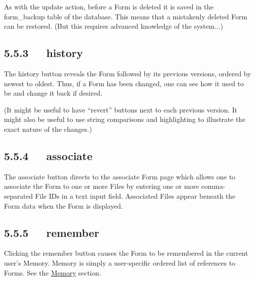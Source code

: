 \documentclass[letterpaper,10pt,english]{sphinxmanual}
\begin{document}
As with the update action, before a Form is deleted it is saved in the
form\_backup table of the database.  This means that a mistakenly deleted Form
can be restored.  (But this requires advanced knowledge of the system...)


\subsection{5.5.3   history}
\label{documentation:history}
The history button reveals the Form followed by its previous versions, ordered
by newest to oldest.  Thus, if a Form has been changed, one can see how it used
to be and change it back if desired.

(It might be useful to have ``revert'' buttons next to each previous version.  It
might also be useful to use string comparisons and highlighting to illustrate
the exact nature of the changes.)


\subsection{5.5.4   associate}
\label{documentation:associate}
The associate button directs to the associate Form page which allows one to
associate the Form to one or more Files by entering one or more comma-separated
File IDs in a text input field.  Associated Files appear beneath the Form
data when the Form is displayed.


\subsection{5.5.5   remember}
\label{documentation:remember}
Clicking the remember button causes the Form to be remembered in the current
user's Memory.  Memory is simply a user-specific ordered list of references to
Forms.  See the {\hyperref[documentation:memory]{Memory}} section.
\end{document}
